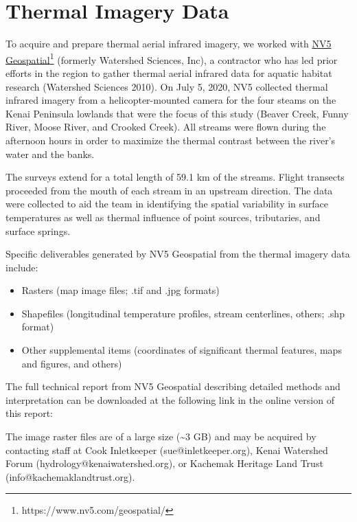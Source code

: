 \documentclass[
  letterpaper,
  DIV=11,
  numbers=noendperiod]{scrreprt}
\begin{document}

\hypertarget{thermal-imagery-data}{%
\chapter{Thermal Imagery Data}\label{thermal-imagery-data}}

To acquire and prepare thermal aerial infrared imagery, we worked with
\href{https://www.nv5.com/geospatial/}{NV5 Geospatial}\footnote{https://www.nv5.com/geospatial/}
(formerly Watershed Sciences, Inc), a contractor who has led prior
efforts in the region to gather thermal aerial infrared data for aquatic
habitat research (Watershed Sciences 2010). On July 5, 2020, NV5
collected thermal infrared imagery from a helicopter-mounted camera for
the four steams on the Kenai Peninsula lowlands that were the focus of
this study (Beaver Creek, Funny River, Moose River, and Crooked Creek).
All streams were flown during the afternoon hours in order to maximize
the thermal contrast between the river's water and the banks.

The surveys extend for a total length of 59.1 km of the streams. Flight
transects proceeded from the mouth of each stream in an upstream
direction. The data were collected to aid the team in identifying the
spatial variability in surface temperatures as well as thermal influence
of point sources, tributaries, and surface springs.

Specific deliverables generated by NV5 Geospatial from the thermal
imagery data include:

\begin{itemize}
\item
  Rasters (map image files; .tif and .jpg formats)
\item
  Shapefiles (longitudinal temperature profiles, stream centerlines,
  others; .shp format)
\item
  Other supplemental items (coordinates of significant thermal features,
  maps and figures, and others)
\end{itemize}

The full technical report from NV5 Geospatial describing detailed
methods and interpretation can be downloaded at the following link in
the online version of this report:

The image raster files are of a large size (\textasciitilde3 GB) and may
be acquired by contacting staff at Cook Inletkeeper
(sue@inletkeeper.org), Kenai Watershed Forum
(hydrology@kenaiwatershed.org), or Kachemak Heritage Land Trust
(info@kachemaklandtrust.org).
\end{document}

